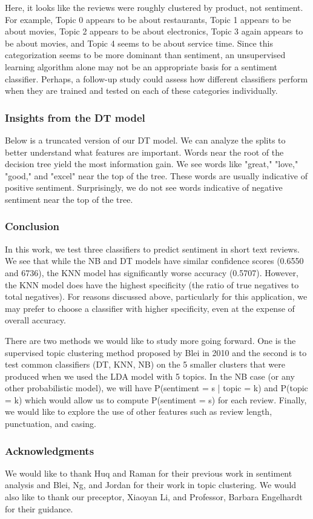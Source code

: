 \documentclass{article} %
\begin{document}
Here, it looks like the reviews were roughly clustered by product, not sentiment. For example, Topic 0 appears to be about restaurants, Topic 1 appears to be about movies, Topic 2 appears to be about electronics, Topic 3 again appears to be about movies, and Topic 4 seems to be about service time. Since this categorization seems to be more dominant than sentiment, an unsupervised learning algorithm alone may not be an appropriate basis for a sentiment classifier. Perhaps, a follow-up study could assess how different classifiers perform when they are trained and tested on each of these categories individually. 

\subsubsection*{Insights from the DT model }
Below is a truncated version of our DT model. We can analyze the splits to better understand what features are important. Words near the root of the decision tree yield the most information gain. We see words like "great," "love," "good," and "excel" near the top of the tree. These words are usually indicative of positive sentiment. Surprisingly, we do not see words indicative of negative sentiment near the top of the tree. 

\subsubsection*{Conclusion}
In this work, we test three classifiers to predict sentiment in short text reviews. We see that while the NB and DT models have similar confidence scores (0.6550 and 6736), the KNN model has significantly worse accuracy (0.5707). However, the KNN model does have the highest specificity (the ratio of true negatives to total negatives). For reasons discussed above, particularly for this application, we may prefer to choose a classifier with higher specificity, even at the expense of overall accuracy. 

There are two methods we would like to study more going forward. One is the supervised topic clustering method proposed by Blei in 2010 \cite{blei2010} and the second is to test common classifiers (DT, KNN, NB) on the 5 smaller clusters that were produced when we used the LDA model with 5 topics. In the NB case (or any other probabilistic model), we will have P(sentiment = s | topic = k) and P(topic = k) which would allow us to compute P(sentiment = s) for each review. Finally, we would like to explore the use of other features such as review length, punctuation, and casing. 

\subsubsection*{Acknowledgments}
We would like to thank Huq and Raman for their previous work in sentiment analysis and Blei, Ng, and Jordan for their work in topic clustering. We would also like to thank our preceptor, Xiaoyan Li, and Professor, Barbara Engelhardt for their guidance. 



\end{document}
